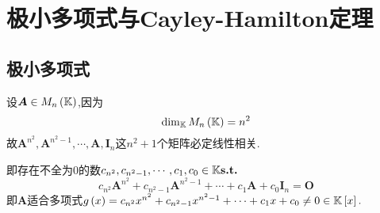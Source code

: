 \newpage
\section{极小多项式与Cayley-Hamilton定理}
\subsection{极小多项式}
设$\bm{A}\in M_n\left(
    \mathbb{K}
    \right)$,因为
\[
    \dim_{\mathbb{K} }M_n\left(
    \mathbb{K}
    \right)=n^2
\]故$\bm{A}^{n^2},\bm{A}^{n^2-1},\cdots,\bm{A},\bm{I}_n$这$n^2+1$个矩阵必定线性相关.

即存在不全为$0$的数$c_{n^2},c_{n^2-1},\cdots,c_1,c_0\in\mathbb{K} \textup{\bfseries{s.t.}}$
\[
    c_{n^2}\bm{A}^{n^2}+c_{n^2-1}\bm{A}^{n^2-1}+\cdots+c_1\bm{A}+c_0\bm{I}_n=\bm{O}
\]即$\bm{A}$适合多项式$g\left(x\right)=
    c_{n^2}x^{n^2}+c_{n^2-1}x^{n^2-1}+\cdots+c_1x+c_0\neq 0\in\mathbb{K} \left[x\right].$

